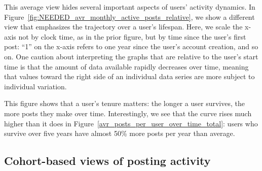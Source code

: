 This average view hides several important aspects of users' activity dynamics.  In Figure~\ref{fig:NEEDED_avr_monthly_active_posts_relative}, we show a different view that emphasizes the trajectory over a user's lifespan.  Here, we scale the x-axis not by clock time, as in the prior figure, but by time since the user's first post: ``1'' on the x-axis refers to one year since the user's account creation, and so on.  
One caution about interpreting the graphs that are relative to the user's start time is that the amount of data available rapidly decreases over time, meaning that values toward the right side of an individual data series are more subject to individual variation.  

This figure shows that a user's tenure matters: the longer a user survives, the more posts they make over time.  Interestingly, we see that the curve rises much higher than it does in Figure~\ref{avr_posts_per_user_over_time_total}: users who survive over five years have almost 50\% more posts per year than average. 

\subsection{Cohort-based views of posting activity}

